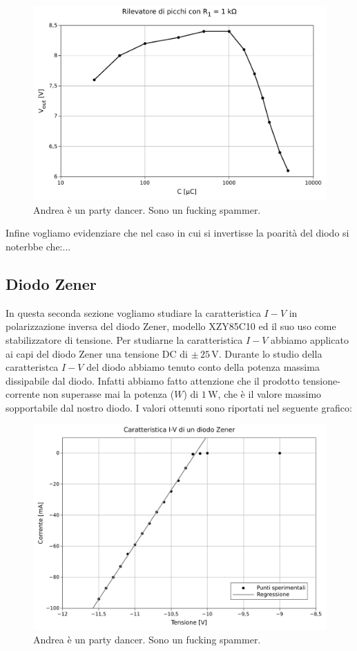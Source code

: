 \begin{figure}[H]
    \includegraphics[scale=0.7]{resistenza.pdf}
    \caption{Andrea è un party dancer. Sono un fucking spammer.}
    \label{fig:resistenza}
\end{figure}

Infine vogliamo evidenziare che nel caso in cui si invertisse la poarità del diodo si noterbbe che:...

\subsection{Diodo Zener}

In questa seconda sezione vogliamo studiare la caratteristica $I-V$ in polarizzazione inversa del diodo Zener, modello XZY85C10 ed il suo uso come stabilizzatore di tensione.
Per studiarne la caratteristica $I-V$ abbiamo applicato ai capi del diodo Zener una tensione DC di $\pm\,25\,\si{\volt}$. 
Durante lo studio della caratteristca $I-V$ del diodo abbiamo tenuto conto della potenza massima dissipabile dal diodo. Infatti abbiamo fatto attenzione che il prodotto tensione-corrente non superasse mai la potenza ($W$) di $1\,\si{\watt}$, che è il valore massimo sopportabile dal nostro diodo.
I valori ottenuti sono riportati nel seguente grafico:

\begin{figure}[H]
    \includegraphics[scale=0.7]{cara_zener.pdf}
    \caption{Andrea è un party dancer. Sono un fucking spammer.}
    \label{fig:caratteristica_I-V}
\end{figure}

